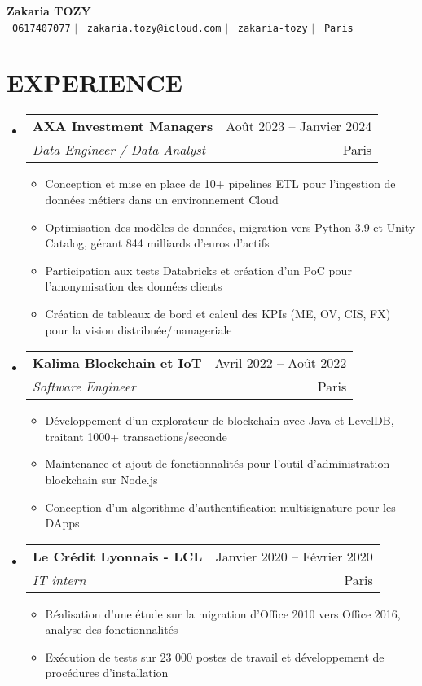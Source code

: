 \documentclass[letterpaper,11pt]{article}
\makeatletter
\newcommand{\resumeItem}[1]{
  \item\small{
    {#1 \vspace{-1pt}}
  }
}
\newcommand{\resumeSubheading}[4]{
  \vspace{-1pt}\item
    \begin{tabular*}{\textwidth}[t]{l@{\extracolsep{\fill}}r}
      \textbf{#1} & {\color{dark-grey}\small #2}\vspace{1pt}\\
      \textit{#3} & {\color{dark-grey} \small #4}\\
    \end{tabular*}\vspace{-4pt}
}
\newcommand{\resumeSubHeadingListStart}{\begin{itemize}[leftmargin=0in, label={}]}
\newcommand{\resumeSubHeadingListEnd}{\end{itemize}}
\newcommand{\resumeItemListStart}{\begin{itemize}}
\newcommand{\resumeItemListEnd}{\end{itemize}\vspace{0pt}}
\makeatother
\begin{document}
\begin{center}
    \textbf{\Huge Zakaria TOZY} \\ \vspace{5pt}
    \small \faPhone\ \texttt{0617407077} \hspace{1pt} $|$
    \hspace{1pt} \faEnvelope\ \texttt{zakaria.tozy@icloud.com} \hspace{1pt} $|$
    \hspace{1pt} \faLinkedin\ \texttt{zakaria-tozy} \hspace{1pt} $|$
    \hspace{1pt} \faMapMarker\ \texttt{Paris}
    \\ \vspace{-3pt}
\end{center}

\section{EXPERIENCE}
\resumeSubHeadingListStart
    \resumeSubheading
      {AXA Investment Managers}{Ao\^ut 2023 -- Janvier 2024}
      {Data Engineer / Data Analyst}{Paris}
      \resumeItemListStart
        \resumeItem{Conception et mise en place de 10+ pipelines ETL pour l'ingestion de donn\'ees m\'etiers dans un environnement Cloud}
        \resumeItem{Optimisation des mod\`eles de donn\'ees, migration vers Python 3.9 et Unity Catalog, g\'erant 844 milliards d'euros d'actifs}
        \resumeItem{Participation aux tests Databricks et cr\'eation d'un PoC pour l'anonymisation des donn\'ees clients}
        \resumeItem{Cr\'eation de tableaux de bord et calcul des KPIs (ME, OV, CIS, FX) pour la vision distribu\'ee/manageriale}
      \resumeItemListEnd
    \resumeSubheading
      {Kalima Blockchain et IoT}{Avril 2022 -- Ao\^ut 2022}
      {Software Engineer}{Paris}
      \resumeItemListStart
        \resumeItem{D\'eveloppement d'un explorateur de blockchain avec Java et LevelDB, traitant 1000+ transactions/seconde}
        \resumeItem{Maintenance et ajout de fonctionnalit\'es pour l'outil d'administration blockchain sur Node.js}
        \resumeItem{Conception d'un algorithme d'authentification multisignature pour les DApps}
      \resumeItemListEnd
    \resumeSubheading
      {Le Cr\'edit Lyonnais - LCL}{Janvier 2020 -- F\'evrier 2020}
      {IT intern}{Paris}
      \resumeItemListStart
        \resumeItem{R\'ealisation d'une \'etude sur la migration d'Office 2010 vers Office 2016, analyse des fonctionnalit\'es}
        \resumeItem{Ex\'ecution de tests sur 23 000 postes de travail et d\'eveloppement de proc\'edures d'installation}
      \resumeItemListEnd
  \resumeSubHeadingListEnd
\end{document}

